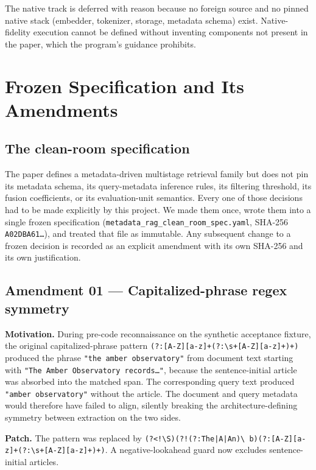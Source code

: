 \documentclass[11pt,a4paper]{article}
\begin{document}
The native track is deferred with reason because no foreign source
and no pinned native stack (embedder, tokenizer, storage, metadata
schema) exist. Native-fidelity execution cannot be defined without
inventing components not present in the paper, which the program's
guidance prohibits.

\section{Frozen Specification and Its Amendments}\label{sec:frozen}

\subsection{The clean-room specification}
The paper defines a metadata-driven multistage retrieval family but
does not pin its metadata schema, its query-metadata inference rules,
its filtering threshold, its fusion coefficients, or its
evaluation-unit semantics. Every one of those decisions had to be
made explicitly by this project. We made them once, wrote them into
a single frozen specification
(\texttt{metadata\_rag\_clean\_room\_spec.yaml}, SHA-256
\texttt{A02DBA61\ldots}), and treated that file as immutable. Any
subsequent change to a frozen decision is recorded as an explicit
amendment with its own SHA-256 and its own justification.

\subsection{Amendment 01 --- Capitalized-phrase regex symmetry}
\textbf{Motivation.} During pre-code reconnaissance on the synthetic
acceptance fixture, the original capitalized-phrase pattern
\texttt{(?:[A-Z][a-z]+(?:\textbackslash s+[A-Z][a-z]+)+)}
produced the phrase \texttt{"the amber observatory"} from document
text starting with \texttt{"The Amber Observatory records\ldots"},
because the sentence-initial article was absorbed into the matched
span. The corresponding query text produced \texttt{"amber
observatory"} without the article. The document and query metadata
would therefore have failed to align, silently breaking the
architecture-defining symmetry between extraction on the two sides.

\textbf{Patch.} The pattern was replaced by
\texttt{(?<!\textbackslash S)(?!(?:The|A|An)\textbackslash
b)(?:[A-Z][a-z]+(?:\textbackslash s+[A-Z][a-z]+)+)}. A
negative-lookahead guard now excludes sentence-initial articles.
\end{document}
